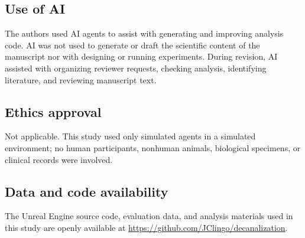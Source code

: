 \documentclass[12pt,fleqn]{article}
\begin{document}
\subsection*{Use of AI}

The authors used AI agents to assist with generating and improving analysis code. AI was not used to generate or draft the scientific content of the manuscript nor with designing or running experiments. During revision, AI assisted with organizing reviewer requests, checking analysis, identifying literature, and reviewing manuscript text.

\subsection*{Ethics approval}
Not applicable. This study used only simulated agents in a simulated environment; no human participants, nonhuman animals, biological specimens, or clinical records were involved.

\subsection*{Data and code availability}
The Unreal Engine source code, evaluation data, and analysis materials used in this study are openly available at \url{https://github.com/JClingo/decanalization}.
\end{document}
